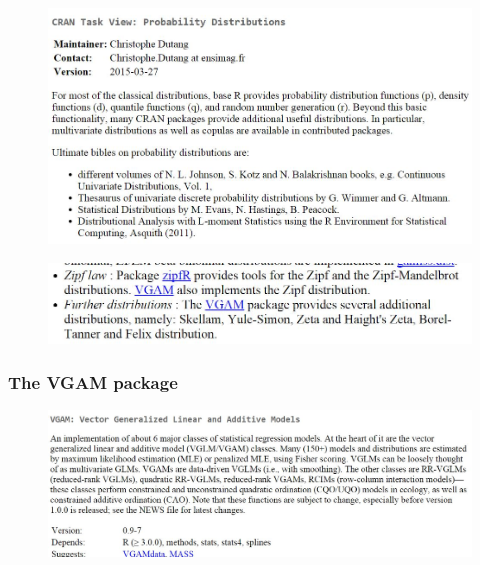 \documentclass[MAIN.tex]{subfiles}
\begin{document}
\begin{frame}
	\begin{figure}
\centering
\includegraphics[width=1.05\linewidth]{images/CRANTaskview}

\end{figure}
\end{frame}
\begin{frame}

	\begin{figure}
\centering
\includegraphics[width=0.7\linewidth]{images/CRANzipf}

\end{figure}

\end{frame}
\begin{frame}
\frametitle{The VGAM package}
	\begin{figure}
\centering
\includegraphics[width=1.05\linewidth]{images/VGAM}

\end{figure}

\end{frame}
\end{document}
